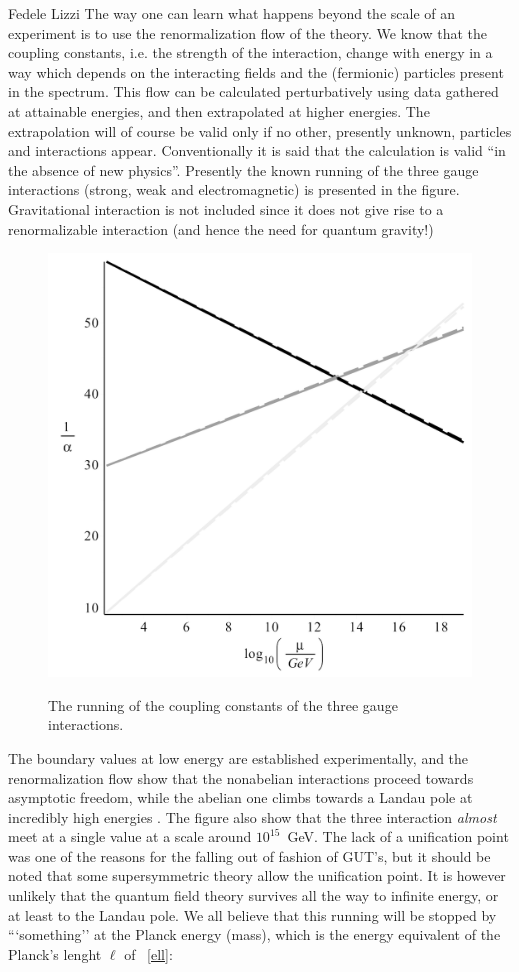 \begin{artengenv}{Fedele Lizzi}
The way one can learn what happens beyond the scale of an experiment is to use the renormalization flow of the theory. We know that the coupling constants, i.e. the strength of the interaction, change with energy in a way which depends on the interacting fields and the (fermionic) particles present in the spectrum. This flow can be calculated perturbatively using data gathered at attainable energies, and then extrapolated at higher energies. The extrapolation will of course be valid only if no other, presently unknown, particles and interactions appear. Conventionally it is said that the calculation is valid ``in the absence of new physics''. Presently the known running of the three gauge interactions (strong, weak and electromagnetic) is presented in the figure. Gravitational interaction is not included since it does not give rise to a renormalizable interaction (and hence the need for quantum gravity!)
\begin{figure}[htb]
{\centering
\includegraphics[width=.9\textwidth]{SPE_Lizzi/gaugerun-druk.pdf}
}
\caption{The running of the coupling constants of the three gauge interactions.}
\end{figure}
The boundary values at low energy are established experimentally, and the renormalization flow show that the nonabelian interactions proceed towards asymptotic freedom, while the abelian one climbs towards a Landau pole at incredibly high energies . The figure also show that the three interaction \emph{almost} meet at a single value at a scale around $10^{15}$~GeV. The lack of a unification point was one of the reasons for the falling out of fashion of GUT's, but it should be noted that some supersymmetric theory allow the unification point. It is however unlikely that the quantum field theory survives all the way to infinite energy, or at least to the Landau pole. We all believe that this running will be stopped by {```something''} at the Planck energy (mass), which is the energy equivalent of the Planck's lenght $\ell$ of ~\eqref{ell}:

\end{artengenv}
